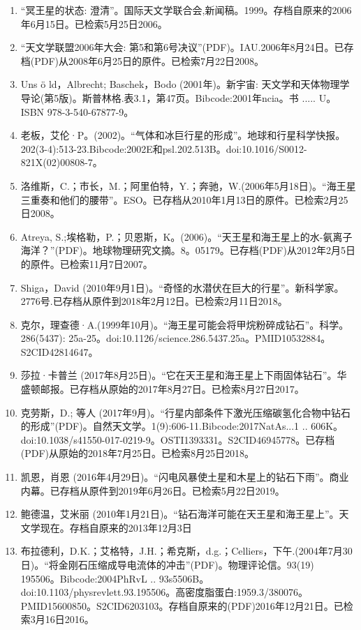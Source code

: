 \begin{enumerate}
\item “冥王星的状态: 澄清”。国际天文学联合会,新闻稿。1999。存档自原来的2006年6月15日。已检索5月25日2006。
\item “天文学联盟2006年大会: 第5和第6号决议”(PDF)。IAU.2006年8月24日。已存档(PDF)从2008年6月25日的原件。已检索7月22日2008。
\item Uns ö ld，Albrecht; Baschek，Bodo (2001年)。新宇宙: 天文学和天体物理学导论(第5版)。斯普林格.表3.1，第47页。Bibcode:2001年ncia。书 ..... U。ISBN  978-3-540-67877-9。
\item 老板，艾伦·P。(2002)。“气体和冰巨行星的形成”。地球和行星科学快报。202(3-4):513-23.Bibcode:2002E和psl.202.513B。doi:10.1016/S0012-821X(02)00808-7。
\item 洛维斯，C.；市长，M.；阿里伯特，Y.；奔驰，W.(2006年5月18日)。“海王星三重奏和他们的腰带”。ESO。已存档从2010年1月13日的原件。已检索2月25日2008。
\item Atreya, S.;埃格勒，P.；贝恩斯，K。(2006)。“天王星和海王星上的水-氨离子海洋？”(PDF)。地球物理研究文摘。8。05179。已存档(PDF)从2012年2月5日的原件。已检索11月7日2007。
\item Shiga，David (2010年9月1日)。“奇怪的水潜伏在巨大的行星”。新科学家。2776号.已存档从原件到2018年2月12日。已检索2月11日2018。
\item 克尔，理查德·A.(1999年10月)。“海王星可能会将甲烷粉碎成钻石”。科学。286(5437): 25a-25。doi:10.1126/science.286.5437.25a。PMID10532884。S2CID42814647。  
\item 莎拉·卡普兰 (2017年8月25日)。“它在天王星和海王星上下雨固体钻石”。华盛顿邮报。已存档从原始的2017年8月27日。已检索8月27日2017。
\item 克劳斯，D.; 等人 (2017年9月)。“行星内部条件下激光压缩碳氢化合物中钻石的形成”(PDF)。自然天文学。1(9):606-11.Bibcode:2017NatAs...1 .. 606K。doi:10.1038/s41550-017-0219-9。OSTI1393331。S2CID46945778。已存档(PDF)从原始的2018年7月25日。已检索8月25日2018。   
\item 凯恩，肖恩 (2016年4月29日)。“闪电风暴使土星和木星上的钻石下雨”。商业内幕。已存档从原件到2019年6月26日。已检索5月22日2019。
\item 鲍德温，艾米丽 (2010年1月21日)。“钻石海洋可能在天王星和海王星上”。天文学现在。存档自原来的2013年12月3日
\item 布拉德利，D.K.；艾格特，J.H.；希克斯，d.g.；Celliers，下午.(2004年7月30日)。“将金刚石压缩成导电流体的冲击”(PDF)。物理评论信。93(19) 195506。Bibcode:2004PhRvL .. 93s5506B。doi:10.1103/physrevlett.93.195506。高密度脂蛋白:1959.3/380076。PMID15600850。S2CID6203103。存档自原来的(PDF)2016年12月21日。已检索3月16日2016。   

\end{enumerate}
